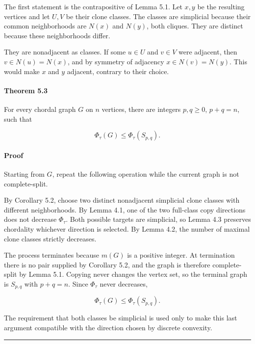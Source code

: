 \documentclass[english,11pt,a4paper]{article}
\begin{document}
The first statement is the contrapositive of Lemma 5.1. Let \(x,y\) be
the resulting vertices and let \(U,V\) be their clone classes. The
classes are simplicial because their common neighborhoods are \(N(x)\)
and \(N(y)\), both cliques. They are distinct because these
neighborhoods differ.

They are nonadjacent as classes. If some \(u\in U\) and \(v\in V\) were
adjacent, then \(v\in N(u)=N(x)\), and by symmetry of adjacency
\(x\in N(v)=N(y)\). This would make \(x\) and \(y\) adjacent, contrary
to their choice.

\paragraph{Theorem 5.3}\label{theorem-5.3}

For every chordal graph \(G\) on \(n\) vertices, there are integers
\(p,q\ge0\), \(p+q=n\), such that

\[
\boxed{
\Phi_\tau(G)\le\Phi_\tau(S_{p,q})
}.
\]

\paragraph{Proof}\label{proof-7}

Starting from \(G\), repeat the following operation while the current
graph is not complete-split.

By Corollary 5.2, choose two distinct nonadjacent simplicial clone
classes with different neighborhoods. By Lemma 4.1, one of the two
full-class copy directions does not decrease \(\Phi_\tau\). Both
possible targets are simplicial, so Lemma 4.3 preserves chordality
whichever direction is selected. By Lemma 4.2, the number of maximal
clone classes strictly decreases.

The process terminates because \(m(G)\) is a positive integer. At
termination there is no pair supplied by Corollary 5.2, and the graph is
therefore complete-split by Lemma 5.1. Copying never changes the vertex
set, so the terminal graph is \(S_{p,q}\) with \(p+q=n\). Since
\(\Phi_\tau\) never decreases,

\[
\Phi_\tau(G)\le\Phi_\tau(S_{p,q}).
\]

The requirement that both classes be simplicial is used only to make
this last argument compatible with the direction chosen by discrete
convexity.

\begin{center}\rule{0.5\linewidth}{0.5pt}\end{center}
\end{document}

